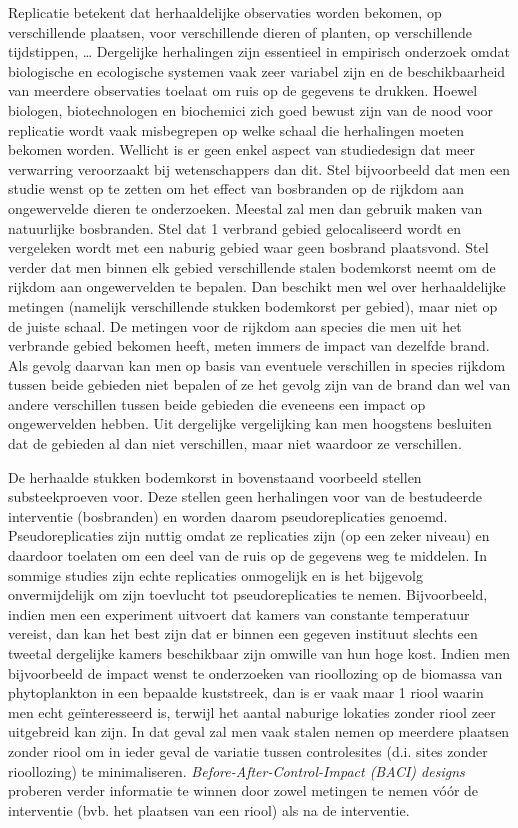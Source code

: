 \documentclass[
  12pt,dutch]{book}
\theoremstyle{definition}
\theoremstyle{definition}
\theoremstyle{definition}
\theoremstyle{definition}
\theoremstyle{remark}
\begin{document}
Replicatie betekent dat herhaaldelijke observaties worden bekomen, op verschillende plaatsen, voor verschillende dieren of planten, op verschillende tijdstippen, \ldots{} Dergelijke herhalingen zijn essentieel in empirisch onderzoek omdat biologische en ecologische systemen vaak zeer variabel zijn en de beschikbaarheid van meerdere observaties toelaat om ruis op de gegevens te drukken. Hoewel biologen, biotechnologen en biochemici zich goed bewust zijn van de nood voor replicatie wordt vaak misbegrepen op welke schaal die herhalingen moeten bekomen worden. Wellicht is er geen enkel aspect van studiedesign dat meer verwarring veroorzaakt bij wetenschappers dan dit. Stel bijvoorbeeld dat men een studie wenst op te zetten om het effect van bosbranden op de rijkdom aan ongewervelde dieren te onderzoeken. Meestal zal men dan gebruik maken van natuurlijke bosbranden. Stel dat 1 verbrand gebied gelocaliseerd wordt en vergeleken wordt met een naburig gebied waar geen bosbrand plaatsvond. Stel verder dat men binnen elk gebied verschillende stalen bodemkorst neemt om de rijkdom aan ongewervelden te bepalen. Dan beschikt men wel over herhaaldelijke metingen (namelijk verschillende stukken bodemkorst per gebied), maar niet op de juiste schaal. De metingen voor de rijkdom aan species die men uit het verbrande gebied bekomen heeft, meten immers de impact van dezelfde brand. Als gevolg daarvan kan men op basis van eventuele verschillen in species rijkdom tussen beide gebieden niet bepalen of ze het gevolg zijn van de brand dan wel van andere verschillen tussen beide gebieden die eveneens een impact op ongewervelden hebben. Uit dergelijke vergelijking kan men hoogstens besluiten dat de gebieden al dan niet verschillen, maar niet waardoor ze verschillen.

De herhaalde stukken bodemkorst in bovenstaand voorbeeld stellen substeekproeven voor. Deze stellen geen herhalingen voor van de bestudeerde interventie (bosbranden) en worden daarom pseudoreplicaties genoemd. Pseudoreplicaties zijn nuttig omdat ze replicaties zijn (op een zeker niveau) en daardoor toelaten om een deel van de ruis op de gegevens weg te middelen. In sommige studies zijn echte replicaties onmogelijk en is het bijgevolg onvermijdelijk om zijn toevlucht tot pseudoreplicaties te nemen. Bijvoorbeeld, indien men een experiment uitvoert dat kamers van constante temperatuur vereist, dan kan het best zijn dat er binnen een gegeven instituut slechts een tweetal dergelijke kamers beschikbaar zijn omwille van hun hoge kost. Indien men bijvoorbeeld de impact wenst te onderzoeken van rioollozing op de biomassa van phytoplankton in een bepaalde kuststreek, dan is er vaak maar 1 riool waarin men echt geïnteresseerd is, terwijl het aantal naburige lokaties zonder riool zeer uitgebreid kan zijn. In dat geval zal men vaak stalen nemen op meerdere plaatsen zonder riool om in ieder geval de variatie tussen controlesites (d.i. sites zonder rioollozing) te minimaliseren. \emph{Before-After-Control-Impact (BACI) designs} proberen verder informatie te winnen door zowel metingen te nemen vóór de interventie (bvb. het plaatsen van een riool) als na de interventie.
\end{document}
